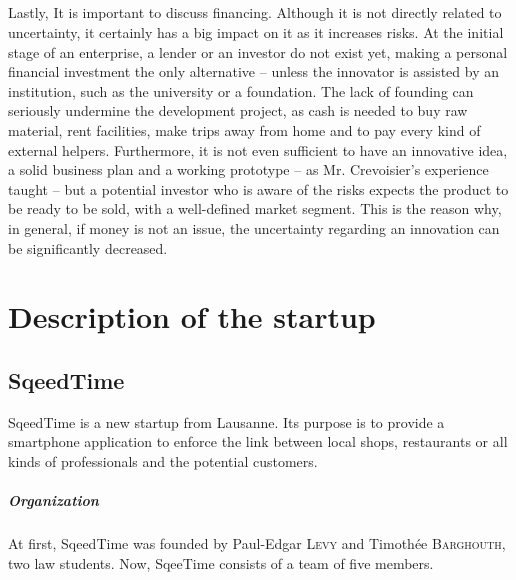 \documentclass[twoside]{report}
\begin{document}
\paragraph{}
Lastly, It is important to discuss financing. Although it is not directly related to uncertainty, it certainly has a big impact on it as it increases risks. At the initial stage of an enterprise, a lender or an investor do not exist yet, making a personal financial investment the only alternative – unless the innovator is assisted by an institution, such as the university or a foundation. The lack of founding can seriously undermine the development project, as cash is needed to buy raw material, rent facilities, make trips away from home and to pay every kind of external helpers. Furthermore, it is not even sufficient to have an innovative idea, a solid business plan and a working prototype – as Mr. Crevoisier’s experience taught – but a potential investor who is aware of the risks expects the product to be ready to be sold, with a well-defined market segment. This is the reason why, in general, if money is not an issue, the uncertainty regarding an innovation can be significantly decreased.









\chapter{Description of the startup}
\section{SqeedTime}
SqeedTime is a new startup from Lausanne. Its purpose is to provide a smartphone application to enforce the link between local shops, restaurants or all kinds of professionals and the potential customers.



\paragraph{Organization}
At first, SqeedTime was founded by Paul-Edgar \textsc{Levy} and Timothée \textsc{Barghouth}, two law students. Now, SqeeTime consists of a team of five members.
\end{document}
